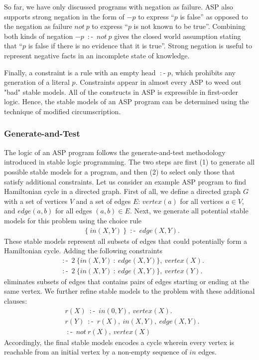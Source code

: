 So far, we have only discussed programs with negation as failure. ASP also supports 
strong negation in the form of $-p$ to express ``$p$ is false'' as opposed to 
the negation as failure $not \: p$ to express ``$p$ is not known to be true''. Combining 
both kinds of negation $-p \: \mathop{:\!\!-} \: not \: p$ gives the closed world assumption 
stating that ``$p$ is false if there is no evidence that it is true''. Strong negation 
is useful to represent negative facts in an incomplete state of knowledge.

Finally, a constraint is a rule with an empty head $\mathop{:\!\!-} p$, which prohibits 
any generation of a literal $p$. Constraints appear in almost every ASP to weed out 
"bad" stable models. All of the constructs in ASP is expressible in first-order 
logic. Hence, the stable models of an ASP program can be determined using the 
technique of modified circumscription.

\subsubsection{Generate-and-Test}
The logic of an ASP program follows the generate-and-test methodology introduced in 
stable logic programming. The two steps are first (1) to generate all possible stable models 
for a program, and then (2) to select only those that satisfy additional constraints. Let us 
consider an example ASP program to find Hamiltonian cycle in a directed graph. First of all, 
we define a directed graph $G$ with a set of vertices $V$ and a set of edges $E$: 
$vertex(a)$ for all vertices $a \in V$, and $edge(a,b)$ for all edges $(a,b) \in E$. Next, 
we generate all potential stable models for this problem using the choice rule 
\begin{align*}
    & \{ \: in(X,Y) \: \} \: \mathop{:\!\!-} \: edge(X,Y). 
\end{align*}
These stable models represent all subsets of edges that could potentially form a Hamiltonian 
cycle. Adding the following constraints 
\begin{align*}
    & \mathop{:\!\!-} \: 2 \: \{in(X,Y) \: : \: edge(X,Y)\}, \: vertex(X). \\
    & \mathop{:\!\!-} \: 2 \: \{in(X,Y) \: : \: edge(X,Y)\}, \: vertex(Y). 
\end{align*}
eliminates subsets of edges that contains pairs of edges starting or ending at the same 
vertex. We further refine stable models to the problem with these additional clauses: 
\begin{align*}
    & r(X) \: \mathop{:\!\!-} \: in(0,Y), \: vertex(X).\\
    & r(Y) \: \mathop{:\!\!-} \: r(X), \: in(X,Y), \: edge(X,Y). \\ 
    & \mathop{:\!\!-} \: not \: r(X), \: vertex(X)
\end{align*}
Accordingly, the final stable models encodes a cycle wherein every vertex is reachable from an initial 
vertex by a non-empty sequence of $in$ edges.   

